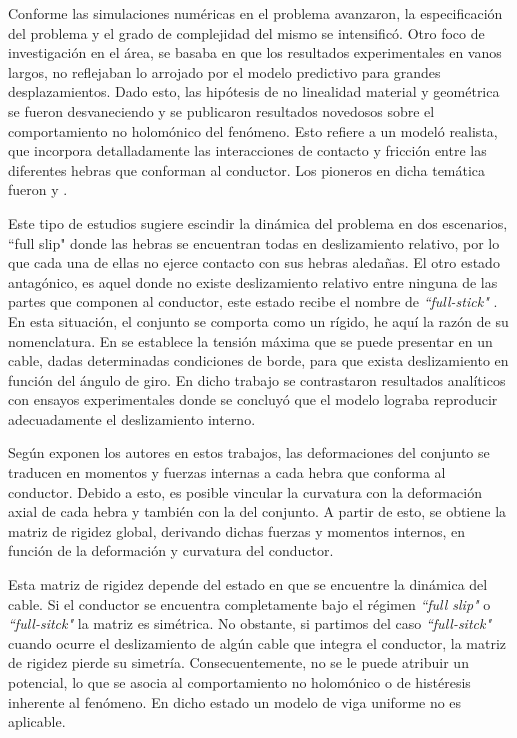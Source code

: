 Conforme las simulaciones numéricas en el problema avanzaron, la especificación del problema y el grado de complejidad del mismo se intensificó. Otro foco de investigación en el área, se basaba en que los resultados experimentales en vanos largos, no reflejaban lo arrojado por el modelo predictivo para grandes desplazamientos. Dado esto, las hipótesis de no linealidad material y geométrica se fueron desvaneciendo y se publicaron resultados novedosos sobre el comportamiento no holomónico del fenómeno. Esto refiere a un modeló realista, que incorpora detalladamente las interacciones de contacto y fricción entre las diferentes hebras que conforman al conductor. Los pioneros en dicha temática fueron \cite {Papailiou1997} y \cite{Kutterer1992}.

Este tipo de estudios sugiere escindir la dinámica del problema en dos escenarios, ``full slip" donde las hebras se encuentran todas en deslizamiento relativo, por lo que cada una de ellas no ejerce contacto con sus hebras aledañas. El otro estado antagónico, es aquel donde no existe deslizamiento relativo entre ninguna de las partes que componen al conductor, este estado recibe el nombre de \textit{``full-stick" }. En esta situación, el conjunto se comporta como un rígido, he aquí la razón de su nomenclatura. En \cite {Papailiou1997} se establece la tensión máxima que se puede presentar en un cable, dadas determinadas condiciones de borde, para que exista deslizamiento en función del ángulo de giro. En dicho trabajo se contrastaron resultados analíticos con ensayos experimentales donde se concluyó que el modelo lograba reproducir adecuadamente el deslizamiento interno. 

Según exponen los autores en estos trabajos, las deformaciones del conjunto se traducen en momentos y fuerzas internas a cada hebra que conforma al conductor. Debido a esto, es posible vincular la curvatura con la deformación axial de cada hebra y también con la del conjunto. A partir de esto, se obtiene la matriz de rigidez global, derivando dichas fuerzas y momentos internos, en función de la deformación y curvatura del conductor.

Esta matriz de rigidez depende del estado en que se encuentre la dinámica del cable. Si el conductor se encuentra completamente bajo el régimen \textit{``full slip"} o  \textit{``full-sitck" } la matriz es simétrica. No obstante, si partimos del caso \textit{``full-sitck" } cuando ocurre el deslizamiento de algún cable que integra el conductor, la matriz de rigidez pierde su simetría. Consecuentemente, no se le puede atribuir un potencial, lo que se asocia al comportamiento no holomónico o de histéresis inherente al fenómeno. En dicho estado un modelo de viga uniforme no es aplicable.

